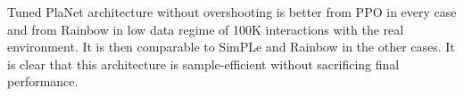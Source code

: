 Tuned PlaNet architecture without overshooting is better from PPO in every case and from Rainbow in low data regime of 100K interactions with the real environment. It is then comparable to SimPLe and Rainbow in the other cases. It is clear that this architecture is sample-efficient without sacrificing final performance.
